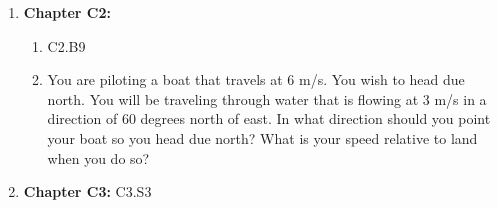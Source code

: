 \documentclass[12pt]{article}
\begin{document}
\begin{enumerate}
\setlength{\itemsep}{-1mm}
\item {\bf Chapter C2:}
  \begin{enumerate}
  \item C2.B9
    \item You are piloting a boat that travels at 6 m/s.  You wish to
      head due north.  You will be traveling through water that is
      flowing at 3 m/s in a direction of 60 degrees north of east.  In
      what direction should you point your boat so you head due north?
      What is your speed relative to land when you do so?
  \end{enumerate}

  \item {\bf Chapter C3:}  C3.S3
\end{enumerate}
\end{document}
